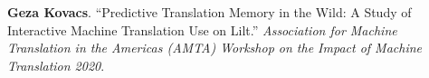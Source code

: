 
\textbf{Geza Kovacs}. ``Predictive Translation Memory in the Wild: A Study of Interactive Machine Translation Use on Lilt.'' \emph{Association for Machine Translation in the Americas (AMTA) Workshop on the Impact of Machine Translation 2020}.\\